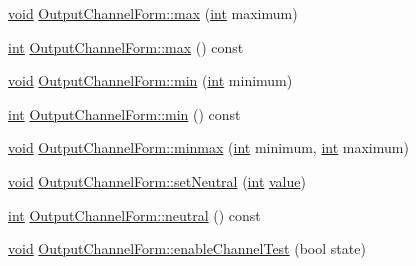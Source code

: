 \begin{DoxyCompactItemize}
\item 
\hyperlink{group___u_a_v_objects_plugin_ga444cf2ff3f0ecbe028adce838d373f5c}{void} \hyperlink{group___config_plugin_gadeee570b83855701e61945279673cd59}{Output\-Channel\-Form\-::max} (\hyperlink{ioapi_8h_a787fa3cf048117ba7123753c1e74fcd6}{int} maximum)
\item 
\hyperlink{ioapi_8h_a787fa3cf048117ba7123753c1e74fcd6}{int} \hyperlink{group___config_plugin_gac5e9e5be40f804ee632232a3e980ee0d}{Output\-Channel\-Form\-::max} () const 
\item 
\hyperlink{group___u_a_v_objects_plugin_ga444cf2ff3f0ecbe028adce838d373f5c}{void} \hyperlink{group___config_plugin_gac5d132282f1a4c2233999a1041995124}{Output\-Channel\-Form\-::min} (\hyperlink{ioapi_8h_a787fa3cf048117ba7123753c1e74fcd6}{int} minimum)
\item 
\hyperlink{ioapi_8h_a787fa3cf048117ba7123753c1e74fcd6}{int} \hyperlink{group___config_plugin_ga2086e4a8bc1572b98114b0272313ed2a}{Output\-Channel\-Form\-::min} () const 
\item 
\hyperlink{group___u_a_v_objects_plugin_ga444cf2ff3f0ecbe028adce838d373f5c}{void} \hyperlink{group___config_plugin_gad231eb8bdcfa798ec5246049fdd07ae4}{Output\-Channel\-Form\-::minmax} (\hyperlink{ioapi_8h_a787fa3cf048117ba7123753c1e74fcd6}{int} minimum, \hyperlink{ioapi_8h_a787fa3cf048117ba7123753c1e74fcd6}{int} maximum)
\item 
\hyperlink{group___u_a_v_objects_plugin_ga444cf2ff3f0ecbe028adce838d373f5c}{void} \hyperlink{group___config_plugin_ga46c4da3a30cc25c1178b9f9a125c8660}{Output\-Channel\-Form\-::set\-Neutral} (\hyperlink{ioapi_8h_a787fa3cf048117ba7123753c1e74fcd6}{int} \hyperlink{glext_8h_aa0e2e9cea7f208d28acda0480144beb0}{value})
\item 
\hyperlink{ioapi_8h_a787fa3cf048117ba7123753c1e74fcd6}{int} \hyperlink{group___config_plugin_ga7ec2288bf27bf15dfb962c5e965d008e}{Output\-Channel\-Form\-::neutral} () const 
\item 
\hyperlink{group___u_a_v_objects_plugin_ga444cf2ff3f0ecbe028adce838d373f5c}{void} \hyperlink{group___config_plugin_ga306e95f301ee75290ea828d4c7e04a60}{Output\-Channel\-Form\-::enable\-Channel\-Test} (bool state)
\end{DoxyCompactItemize}
